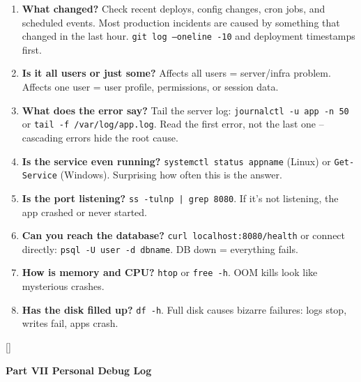 \documentclass[11pt, letterpaper]{article}
\newcommand{\greysections}{%
  \titleformat{\section}{\large\bfseries\color{sectiongrey}}{}{0em}{}[\color{sectiongrey}\titlerule]%
  \titleformat{\subsection}{\normalsize\bfseries\color{sectiongrey!80!black}}{}{0em}{}%
}
\newcommand{\partbanner}[3]{%
  \begin{tcolorbox}[colback=#1, colframe=#2, boxrule=1.2pt, arc=4pt,
    left=8pt, right=8pt, top=6pt, bottom=6pt]
    \begin{center}{\LARGE\bfseries #3}\end{center}
  \end{tcolorbox}%
}
\begin{document}
\begin{tcolorbox}[colback=part6bg, colframe=sectionred,
  title={\bfseries Under 5 Minutes: Orient Yourself Before Touching Anything}, arc=3pt, boxrule=1pt]
\begin{enumerate}[leftmargin=*, noitemsep]
  \item \textbf{What changed?} Check recent deploys, config changes, cron jobs, and scheduled events. Most production incidents are caused by something that changed in the last hour. \texttt{git log --oneline -10} and deployment timestamps first.
  \item \textbf{Is it all users or just some?} Affects all users = server/infra problem. Affects one user = user profile, permissions, or session data.
  \item \textbf{What does the error say?} Tail the server log: \texttt{journalctl -u app -n 50} or \texttt{tail -f /var/log/app.log}. Read the first error, not the last one -- cascading errors hide the root cause.
  \item \textbf{Is the service even running?} \texttt{systemctl status appname} (Linux) or \texttt{Get-Service} (Windows). Surprising how often this is the answer.
  \item \textbf{Is the port listening?} \texttt{ss -tulnp | grep 8080}. If it's not listening, the app crashed or never started.
  \item \textbf{Can you reach the database?} \texttt{curl localhost:8080/health} or connect directly: \texttt{psql -U user -d dbname}. DB down = everything fails.
  \item \textbf{How is memory and CPU?} \texttt{htop} or \texttt{free -h}. OOM kills look like mysterious crashes.
  \item \textbf{Has the disk filled up?} \texttt{df -h}. Full disk causes bizarre failures: logs stop, writes fail, apps crash.
\end{enumerate}
\end{tcolorbox}

\newpage

\greysections
{}
\partbanner{part7bg}{sectiongrey}{Part VII \quad Personal Debug Log}
\end{document}
